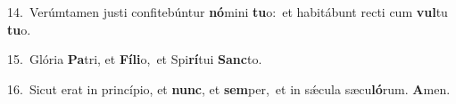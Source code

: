 {\numbfont\textcolor{\numbcolor}{14.}}~Verúmtamen justi confitebúntur \textbf{nó}\-mini \textbf{tu}\-o:~\star et habitábunt recti cum \textbf{vul}\-tu \textbf{tu}\-o.\par
{\numbfont\textcolor{\numbcolor}{15.}}~Glória \textbf{Pa}\-tri, et \textbf{Fí}\-\textbf{li}o,~\star et Spi\-\textbf{rí}\-tui \textbf{Sanc}\-to.\par
{\numbfont\textcolor{\numbcolor}{16.}}~Sicut erat in princípio, et \textbf{nunc}\-, et \textbf{sem}\-per,~\star et in sǽcula sæcu\-\textbf{ló}\-rum. \textbf{A}\-men.\par
